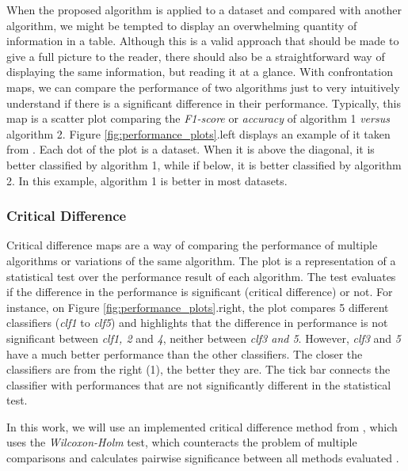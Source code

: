 When the proposed algorithm is applied to a dataset and compared with another algorithm, we might be tempted to display an overwhelming quantity of information in a table. Although this is a valid approach that should be made to give a full picture to the reader, there should also be a straightforward way of displaying the same information, but reading it at a glance. With confrontation maps, we can compare the performance of two algorithms just to very intuitively understand if there is a significant difference in their performance. Typically, this map is a scatter plot comparing the \textit{F1-score} or \textit{accuracy} of algorithm 1 \textit{versus} algorithm 2. Figure \ref{fig:performance_plots}.left displays an example of it taken from \cite{keogh_presentation}. Each dot of the plot is a dataset. When it is above the diagonal, it is better classified by algorithm 1, while if below, it is better classified by algorithm 2. In this example, algorithm 1 is better in most datasets.

\subsubsection{Critical Difference}

Critical difference maps are a way of comparing the performance of multiple algorithms or variations of the same algorithm. The plot is a representation of a statistical test over the performance result of each algorithm. The test evaluates if the difference in the performance is significant (critical difference) or not. For instance, on Figure \ref{fig:performance_plots}.right, the plot compares 5 different classifiers (\textit{clf1} to \textit{clf5}) and highlights that the difference in performance is not significant between \textit{clf1, 2} and \textit{4}, neither between \textit{clf3 and 5}. However, \textit{clf3} and \textit{5} have a much better performance than the other classifiers. The closer the classifiers are from the right (1), the better they are. The tick bar connects the classifier with performances that are not significantly different in the statistical test.
\par
In this work, we will use an implemented critical difference method from \cite{critical_dif}, which uses the  \textit{Wilcoxon-Holm} test, which counteracts the problem of multiple comparisons and calculates pairwise significance between all methods evaluated \cite{stat_test}.